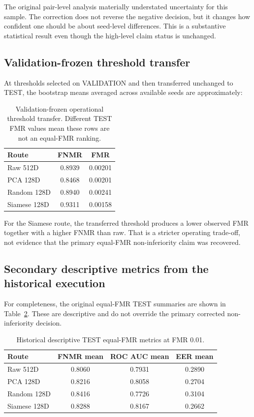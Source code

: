 \documentclass[10pt,a4paper]{article}
\begin{document}
The original pair-level analysis materially understated uncertainty for this sample. The
correction does not reverse the negative decision, but it changes how confident one should
be about seed-level differences. This is a substantive statistical result even though the
high-level claim status is unchanged.

\subsection{Validation-frozen threshold transfer}

At thresholds selected on VALIDATION and then transferred unchanged to TEST, the bootstrap
means averaged across available seeds are approximately:

\begin{table}[ht]
\centering
\caption{Validation-frozen operational threshold transfer. Different TEST FMR values mean
these rows are not an equal-FMR ranking.}
\label{tab:operational}
\begin{tabular}{@{}lcc@{}}
\toprule
Route & FNMR & FMR\\
\midrule
Raw 512D & 0.8939 & 0.00201\\
PCA 128D & 0.8468 & 0.00201\\
Random 128D & 0.8940 & 0.00241\\
Siamese 128D & 0.9311 & 0.00158\\
\bottomrule
\end{tabular}
\end{table}

For the Siamese route, the transferred threshold produces a lower observed FMR together
with a higher FNMR than raw. That is a stricter operating trade-off, not evidence that the
primary equal-FMR non-inferiority claim was recovered.

\subsection{Secondary descriptive metrics from the historical execution}

For completeness, the original equal-FMR TEST summaries are shown in
Table~\ref{tab:secondary}. These are descriptive and do not override the primary corrected
non-inferiority decision.

\begin{table}[ht]
\centering
\caption{Historical descriptive TEST equal-FMR metrics at FMR 0.01.}
\label{tab:secondary}
\begin{tabular}{@{}lccc@{}}
\toprule
Route & FNMR mean & ROC AUC mean & EER mean\\
\midrule
Raw 512D & 0.8060 & 0.7931 & 0.2890\\
PCA 128D & 0.8216 & 0.8058 & 0.2704\\
Random 128D & 0.8416 & 0.7726 & 0.3104\\
Siamese 128D & 0.8288 & 0.8167 & 0.2662\\
\bottomrule
\end{tabular}
\end{table}
\end{document}
